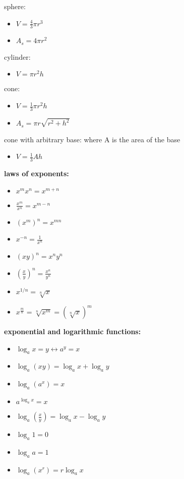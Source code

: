 \documentclass{article}
\begin{document}
	sphere:
		\begin{itemize}
			\item $V = \frac{4}{3}\pi r^3$
			\item $A_s = 4\pi r^2$
		\end{itemize}

	cylinder:
		\begin{itemize}
			\item $V = \pi r^2h$
		\end{itemize}

	cone:
		\begin{itemize}
			\item $V = \frac{1}{3}\pi r^2h$
			\item $A_s = \pi r\sqrt{r^2+h^2}$
		\end{itemize}

	cone with arbitrary base: where A is the area of the base
		\begin{itemize}
			\item $V = \frac{1}{3}Ah$
		\end{itemize}

\textbf{laws of exponents:} 
	\begin{itemize}
		\item $x^mx^n = x^{m+n}$
		\item $\frac{x^m}{x^n} = x^{m-n}$
		\item $(x^m)^n = x^{mn}$
		\item $x^{-n} = \frac{1}{x^n}$
		\item $(xy)^n = x^ny^n$
		\item $(\frac{x}{y})^n = \frac{x^n}{y^n}$ \item $x^{1/n} = \sqrt[n]{x}$
		\item $x^{\frac{m}{n}} = \sqrt[n]{x^m} = (\sqrt[n]{x})^m$
	\end{itemize}

\textbf{exponential and logarithmic functions:}
	\begin{itemize}
		\item $\log_ax = y \leftrightarrow a^y = x$
		\item $\log_a(xy) = \log_ax + \log_ay$
		\item $\log_a(a^x) = x$
		\item $a^{\log_a x} = x$
		\item $\log_a(\frac{x}{y}) = \log_ax - \log_ay$
		\item $\log_a1 = 0$
		\item $\log_aa = 1$
		\item $\log_a(x^r) = r\log_ax$
	\end{itemize}
\end{document}
